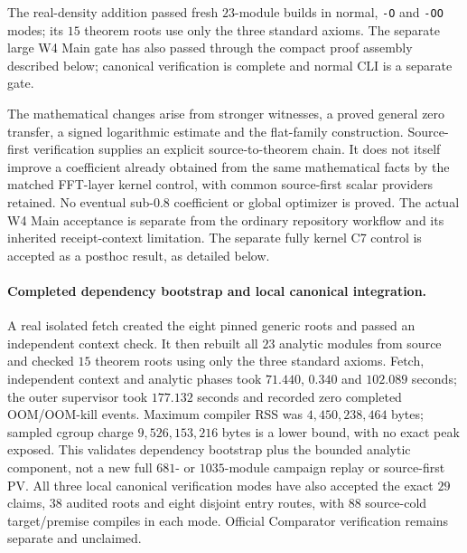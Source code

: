 \documentclass[11pt]{article}
\begin{document}
The real-density addition passed fresh \(23\)-module builds in normal,
\texttt{-O} and \texttt{-OO} modes; its \(15\) theorem roots use only the three
standard axioms. The separate large W4 Main gate has also passed through
the compact proof assembly described below; canonical verification is complete and normal CLI is a separate gate.

The mathematical changes arise from stronger witnesses, a proved general
zero transfer, a signed logarithmic estimate and the flat-family construction.
Source-first verification supplies an explicit source-to-theorem chain.
It does not itself improve a coefficient already obtained from the same
mathematical facts by the matched FFT-layer kernel control, with common
source-first scalar providers retained. No eventual sub-\(0.8\) coefficient
or global optimizer is proved. The actual W4 Main acceptance is separate
from the ordinary repository workflow and its inherited receipt-context
limitation. The separate fully kernel C7 control is
accepted as a posthoc result, as detailed below.


\paragraph{Completed dependency bootstrap and local canonical integration.}
A real isolated fetch created the eight pinned generic roots and passed an
independent context check. It then rebuilt all \(23\) analytic modules from
source and checked \(15\) theorem roots using only the three standard axioms.
Fetch, independent context and analytic phases took \(71.440\), \(0.340\) and
\(102.089\) seconds; the outer supervisor took \(177.132\) seconds and recorded
zero completed OOM/OOM-kill events. Maximum compiler RSS was
\(4{,}450{,}238{,}464\) bytes; sampled cgroup charge
\(9{,}526{,}153{,}216\) bytes is a lower bound, with no exact peak exposed.
This validates dependency bootstrap plus the bounded analytic component,
not a new full \(681\)- or \(1035\)-module campaign replay or source-first PV.
All three local canonical verification modes have also accepted the exact
\(29\) claims, \(38\) audited roots and eight disjoint entry routes, with
\(88\) source-cold target/premise compiles in each mode. Official Comparator
verification remains separate and unclaimed.
\end{document}
